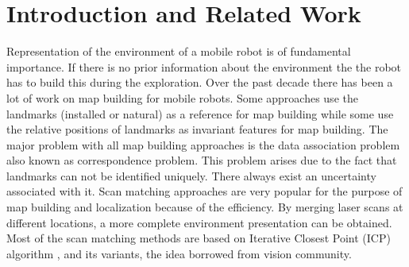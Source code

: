 \documentclass{article}
\begin{document}
\section{Introduction and Related Work}
Representation of the environment of a mobile robot is of
fundamental importance. If there is no prior information about the
environment the the robot has to build this during the exploration.
Over the past decade there has been a lot of work on map building
for mobile robots. Some approaches use the landmarks (installed or
natural) as a reference for map building while some use the relative
positions of landmarks as invariant features for map building.  The
major problem with all map building approaches is the data
association problem also known as correspondence problem. This
problem arises due to the fact that landmarks can not be identified
uniquely. There always exist an uncertainty associated with it. Scan
matching approaches are very popular for the purpose of map building
and localization because of the efficiency. By merging laser scans
at different locations, a more complete environment presentation can
be obtained. Most of the scan matching methods are based on
Iterative Closest Point  (ICP) algorithm \cite{Shewchuck},
and its variants, the idea borrowed from vision community.
\end{document}
